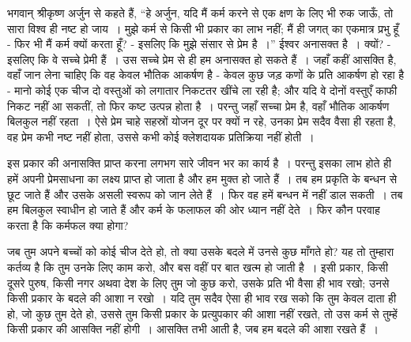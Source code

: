 भगवान् श्रीकृष्ण अर्जुन से कहते हैं, “हे अर्जुन, यदि मैं कर्म करने से एक क्षण के लिए भी रुक जाऊँ, तो सारा विश्व ही नष्ट हो जाय~। मुझे कर्म से किसी भी प्रकार का लाभ नहीं; मैं ही जगत् का एकमात्र प्रभु हूँ - फिर भी मैं कर्म क्यों करता हूँ? - इसलिए कि मुझे संसार से प्रेम है~।” ईश्वर अनासक्त है~। क्यों? - इसलिए कि वे सच्चे प्रेमी हैं~। उस सच्चे प्रेम से ही हम अनासक्त हो सकते हैं~। जहाँ कहीं आसक्ति है, वहाँ जान लेना चाहिए कि वह केवल भौतिक आकर्षण है - केवल कुछ जड़ कणों के प्रति आकर्षण हो रहा है - मानो कोई एक चीज दो वस्तुओं को लगातार निकटतर खींचे ला रही है; और यदि वे दोनों वस्तुएँ काफी निकट नहीं आ सकतीं, तो फिर कष्ट उत्पन्न होता है~। परन्तु जहाँ सच्चा प्रेम है, वहाँ भौतिक आकर्षण बिलकुल नहीं रहता~। ऐसे प्रेम चाहे सहस्रों योजन दूर पर क्यों न रहे, उनका प्रेम सदैव वैसा ही रहता है, वह प्रेम कभी नष्ट नहीं होता, उससे कभी कोई क्लेशदायक प्रतिक्रिया नहीं होती~।

इस प्रकार की अनासक्ति प्राप्त करना लगभग सारे जीवन भर का कार्य है~। परन्तु इसका लाभ होते ही हमें अपनी प्रेमसाधना का लक्ष्य प्राप्त हो जाता है और हम मुक्त हो जाते हैं~। तब हम प्रकृति के बन्धन से छूट जाते हैं और उसके असली स्वरूप को जान लेते हैं~। फिर वह हमें बन्धन में नहीं डाल सकती~। तब हम बिलकुल स्वाधीन हो जाते हैं और कर्म के फलाफल की ओर ध्यान नहीं देते~। फिर कौन परवाह करता है कि कर्मफल क्या होगा?

\newpage

जब तुम अपने बच्चों को कोई चीज देते हो, तो क्या उसके बदले में उनसे कुछ माँगते हो? यह तो तुम्हारा कर्तव्य है कि तुम उनके लिए काम करो, और बस वहीं पर बात खत्म हो जाती है~। इसी प्रकार, किसी दूसरे पुरुष, किसी नगर अथवा देश के लिए तुम जो कुछ करो, उसके प्रति भी वैसा ही भाव रखो; उनसे किसी प्रकार के बदले की आशा न रखो~। यदि तुम सदैव ऐसा ही भाव रख सको कि तुम केवल दाता ही हो, जो कुछ तुम देते हो, उससे तुम किसी प्रकार के प्रत्युपकार की आशा नहीं रखते, तो उस कर्म से तुम्हें किसी प्रकार की आसक्ति नहीं होगी~। आसक्ति तभी आती है, जब हम बदले की आशा रखते हैं~।

